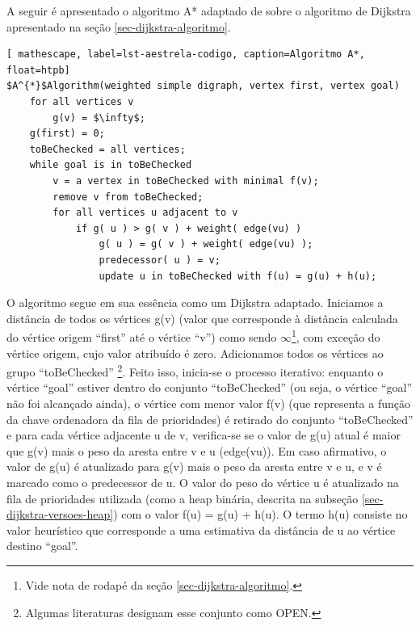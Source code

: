 A seguir é apresentado o algoritmo A* adaptado de  sobre o algoritmo de Dijkstra apresentado na seção \ref{sec-dijkstra-algoritmo}. 

\begin{lstlisting}[ mathescape, label=lst-aestrela-codigo, caption=Algoritmo A*, float=htpb]
$A^{*}$Algorithm(weighted simple digraph, vertex first, vertex goal)
	for all vertices v
		g(v) = $\infty$;
	g(first) = 0;
	toBeChecked = all vertices;
	while goal is in toBeChecked
		v = a vertex in toBeChecked with minimal f(v);
		remove v from toBeChecked;
		for all vertices u adjacent to v
			if g( u ) > g( v ) + weight( edge(vu) )
				g( u ) = g( v ) + weight( edge(vu) );
				predecessor( u ) = v;
				update u in toBeChecked with f(u) = g(u) + h(u);
\end{lstlisting}

O algoritmo segue em sua essência como um Dijkstra adaptado. Iniciamos a distância de todos os vértices g(v) (valor que corresponde à distância calculada do vértice origem ``first'' até o vértice ``v'') como sendo $\infty$\footnote{Vide nota de rodapé da seção \ref{sec-dijkstra-algoritmo}.}, com exceção do vértice origem, cujo valor atribuído é zero. Adicionamos todos os vértices ao grupo ``toBeChecked'' \footnote{Algumas literaturas designam esse conjunto como OPEN.}. Feito isso, inicia-se o processo iterativo: enquanto o vértice ``goal'' estiver dentro do conjunto ``toBeChecked'' (ou seja, o vértice ``goal'' não foi alcançado ainda), o vértice com menor valor f(v) (que representa a função da chave ordenadora da fila de prioridades) é retirado do conjunto ``toBeChecked'' e para cada vértice adjacente u de v, verifica-se se o valor de g(u) atual é maior que g(v) mais o peso da aresta entre v e u (edge(vu)). Em caso afirmativo, o valor de g(u) é atualizado para g(v) mais o peso da aresta entre v e u, e v é marcado como o predecessor de u. O valor do peso do vértice u é atualizado na fila de prioridades utilizada (como a heap binária, descrita na subseção \ref{sec-dijkstra-versoes-heap}) com o valor f(u) = g(u) + h(u). O termo h(u) consiste no valor heurístico que corresponde a uma estimativa da distância de u ao vértice destino ``goal''.

